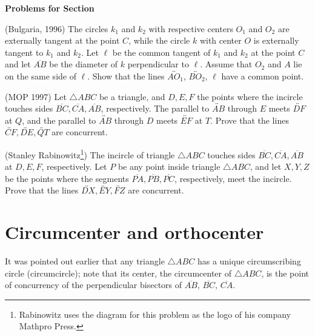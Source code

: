 \documentclass[12pt]{book}
\newcounter{exc}
\numberwithin{exc}{section}
\numberwithin{figure}{section}
\newenvironment{exer}{\vspace{0.1in}
\noindent \textbf{Problems for Section~\thesection} \vspace{0.1in}
\begin{list}{\arabic{exc}.}{\usecounter{exc}}}{\end{list}}
\numberwithin{equation}{theorem}
\def\ii{\item}
\def\line#1{\overleftrightarrow{#1}}
\def\seg#1{\overline{#1}}
\begin{document}
\begin{exer}
\ii (Bulgaria, 1996) \label{ex:bul1996}
The circles $k_1$ and $k_2$ with respective centers $O_1$ and $O_2$
are externally tangent at the point $C$, while the circle $k$ with center
$O$ is externally tangent to $k_1$ and $k_2$. Let $\ell$ be the
common tangent of $k_1$ and $k_2$ at the point $C$ and let 
$\seg{AB}$ be the diameter
of $k$ perpendicular to $\ell$. Assume that $O_2$ and $A$ lie on the same
side of $\ell$. Show that the lines $\line{AO_1}$, $\line{BO_2}$,
$\ell$ have a common
point.

\ii (MOP 1997)
Let $\triangle ABC$ be a triangle, and $D, E, F$ the points where the incircle
touches sides $\seg{BC}, \seg{CA}, \seg{AB}$, respectively. 
The parallel to $\line{AB}$ through
$E$ meets $\line{DF}$ at $Q$, and the parallel to $\line{AB}$ through $D$ 
meets $\line{EF}$
at $T$. Prove that the lines $\line{CF}, \line{DE}, \line{QT}$ are concurrent.

\ii
(Stanley Rabinowitz\footnote{Rabinowitz uses the diagram for this problem
as the logo of his company 
Mathpro Press.}) 
The incircle of triangle $\triangle ABC$ touches sides $\seg{BC},
\seg{CA}, \seg{AB}$ at $D, E, F$, respectively. Let $P$ be any point inside
triangle $\triangle ABC$, and let $X, Y, Z$ be the points where the segments
$\seg{PA}, \seg{PB}, \seg{PC}$, 
respectively, meet the incircle. Prove that the lines
$\line{DX}, \line{EY}, \line{FZ}$ are concurrent.

\end{exer}

\section{Circumcenter and orthocenter}

It was pointed out earlier that any triangle $\triangle ABC$
has a unique circumscribing circle (circumcircle);  note that its center, the circumcenter 
 of $\triangle ABC$, is
the point of concurrency of the perpendicular bisectors
of $\seg{AB}$, $\seg{BC}$, $\seg{CA}$.
\end{document}
